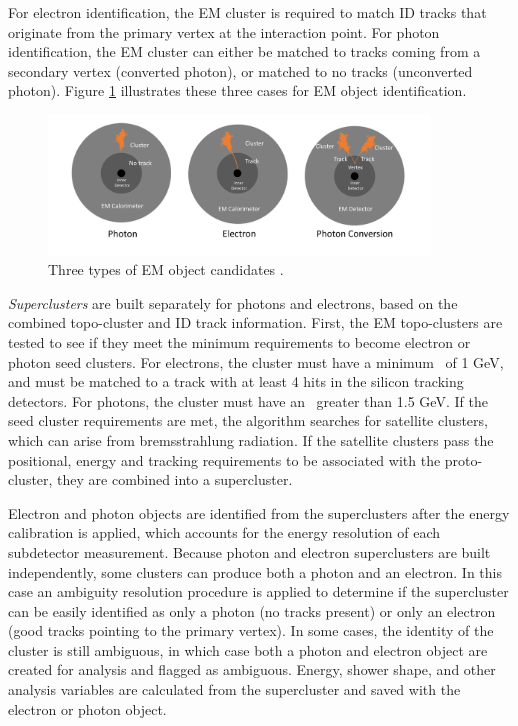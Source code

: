 For electron identification, the EM cluster is required to match ID tracks that originate from the primary vertex at the interaction point. For photon identification, the EM cluster can either be matched to tracks coming from a secondary vertex (converted photon), or matched to no tracks (unconverted photon). Figure \ref{fig:electron_photon_id} illustrates these three cases for EM object identification. \par

\begin{figure}
        \centering
	\includegraphics[width=0.9\textwidth]{figures/ch5/electron_photon_id}
	\caption{Three types of EM object candidates \cite{electron_photon_id}. }
	\label{fig:electron_photon_id}
\end{figure}

\textit{Superclusters} are built separately for photons and electrons, based on the combined topo-cluster and ID track information. First, the EM topo-clusters are tested to see if they meet the minimum requirements to become electron or photon seed clusters. For electrons, the cluster must have a minimum \et~of 1 GeV, and must be matched to a track with at least 4 hits in the silicon tracking detectors. For photons, the cluster must have an \et~greater than 1.5 GeV. If the seed cluster requirements are met, the algorithm searches for satellite clusters, which can arise from bremsstrahlung radiation. If the satellite clusters pass the positional, energy and tracking requirements to be associated with the proto-cluster, they are combined into a supercluster. \par

Electron and photon objects are identified from the superclusters after the energy calibration is applied, which accounts for the energy resolution of each subdetector measurement. Because photon and electron superclusters are built independently, some clusters can produce both a photon and an electron. In this case an ambiguity resolution procedure is applied to determine if the supercluster can be easily identified as only a photon (no tracks present) or only an electron (good tracks pointing to the primary vertex). In some cases, the identity of the cluster is still ambiguous, in which case both a photon and electron object are created for analysis and flagged as ambiguous. Energy, shower shape, and other analysis variables are calculated from the supercluster and saved with the electron or photon object. 

